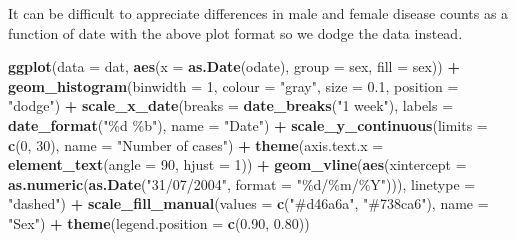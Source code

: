 \documentclass[
]{article}
\newenvironment{Shaded}{\begin{snugshade}}{\end{snugshade}}
\newcommand{\DataTypeTok}[1]{\textcolor[rgb]{0.13,0.29,0.53}{#1}}
\newcommand{\DecValTok}[1]{\textcolor[rgb]{0.00,0.00,0.81}{#1}}
\newcommand{\FloatTok}[1]{\textcolor[rgb]{0.00,0.00,0.81}{#1}}
\newcommand{\KeywordTok}[1]{\textcolor[rgb]{0.13,0.29,0.53}{\textbf{#1}}}
\newcommand{\NormalTok}[1]{#1}
\newcommand{\OperatorTok}[1]{\textcolor[rgb]{0.81,0.36,0.00}{\textbf{#1}}}
\newcommand{\StringTok}[1]{\textcolor[rgb]{0.31,0.60,0.02}{#1}}
\begin{document}
It can be difficult to appreciate differences in male and female disease
counts as a function of date with the above plot format so we dodge the
data instead.

\begin{Shaded}
\begin{Highlighting}[]

\KeywordTok{ggplot}\NormalTok{(}\DataTypeTok{data =}\NormalTok{ dat, }\KeywordTok{aes}\NormalTok{(}\DataTypeTok{x =} \KeywordTok{as.Date}\NormalTok{(odate), }\DataTypeTok{group =}\NormalTok{ sex, }\DataTypeTok{fill =}\NormalTok{ sex)) }\OperatorTok{+}
\StringTok{  }\KeywordTok{geom\_histogram}\NormalTok{(}\DataTypeTok{binwidth =} \DecValTok{1}\NormalTok{, }\DataTypeTok{colour =} \StringTok{"gray"}\NormalTok{, }\DataTypeTok{size =} \FloatTok{0.1}\NormalTok{, }\DataTypeTok{position =} \StringTok{"dodge"}\NormalTok{) }\OperatorTok{+}
\StringTok{  }\KeywordTok{scale\_x\_date}\NormalTok{(}\DataTypeTok{breaks =} \KeywordTok{date\_breaks}\NormalTok{(}\StringTok{"1 week"}\NormalTok{), }\DataTypeTok{labels =} \KeywordTok{date\_format}\NormalTok{(}\StringTok{"\%d \%b"}\NormalTok{), }
     \DataTypeTok{name =} \StringTok{"Date"}\NormalTok{) }\OperatorTok{+}
\StringTok{  }\KeywordTok{scale\_y\_continuous}\NormalTok{(}\DataTypeTok{limits =} \KeywordTok{c}\NormalTok{(}\DecValTok{0}\NormalTok{, }\DecValTok{30}\NormalTok{), }\DataTypeTok{name =} \StringTok{"Number of cases"}\NormalTok{) }\OperatorTok{+}
\StringTok{  }\KeywordTok{theme}\NormalTok{(}\DataTypeTok{axis.text.x =} \KeywordTok{element\_text}\NormalTok{(}\DataTypeTok{angle =} \DecValTok{90}\NormalTok{, }\DataTypeTok{hjust =} \DecValTok{1}\NormalTok{)) }\OperatorTok{+}\StringTok{ }
\StringTok{  }\KeywordTok{geom\_vline}\NormalTok{(}\KeywordTok{aes}\NormalTok{(}\DataTypeTok{xintercept =} \KeywordTok{as.numeric}\NormalTok{(}\KeywordTok{as.Date}\NormalTok{(}\StringTok{"31/07/2004"}\NormalTok{, }\DataTypeTok{format =} \StringTok{"\%d/\%m/\%Y"}\NormalTok{))), }
   \DataTypeTok{linetype =} \StringTok{"dashed"}\NormalTok{) }\OperatorTok{+}\StringTok{ }
\StringTok{  }\KeywordTok{scale\_fill\_manual}\NormalTok{(}\DataTypeTok{values =} \KeywordTok{c}\NormalTok{(}\StringTok{"\#d46a6a"}\NormalTok{, }\StringTok{"\#738ca6"}\NormalTok{), }\DataTypeTok{name =} \StringTok{"Sex"}\NormalTok{) }\OperatorTok{+}\StringTok{ }
\StringTok{  }\KeywordTok{theme}\NormalTok{(}\DataTypeTok{legend.position =} \KeywordTok{c}\NormalTok{(}\FloatTok{0.90}\NormalTok{, }\FloatTok{0.80}\NormalTok{))}
\end{Highlighting}
\end{Shaded}
\end{document}
